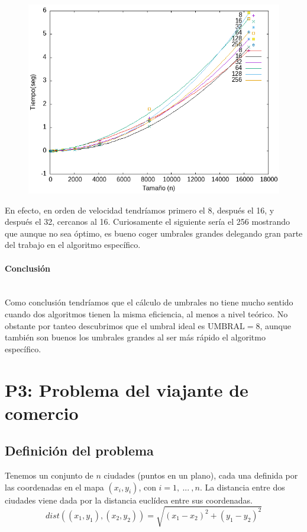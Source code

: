 \documentclass{article}
\newcommand{\myparagraph}[1]{\paragraph{#1}\mbox{}\\}
\begin{document}
    \begin{figure}[H]
        \centering
        \includegraphics[scale=0.7]{P2/Salida_comparativa2.png} 
    \end{figure}

    En efecto, en orden de velocidad tendríamos primero el 8, después el 16,
    y después el 32, cercanos al 16. Curiosamente el siguiente sería el 256
    mostrando que aunque no sea óptimo, es bueno coger umbrales grandes
    delegando gran parte del trabajo en el algoritmo específico.

    \myparagraph{Conclusión}

    Como conclusión tendríamos que el cálculo de umbrales no tiene mucho
    sentido cuando dos algoritmos tienen la misma eficiencia, al menos a
    nivel teórico. No obstante por tanteo descubrimos que el umbral ideal
    es $\text{UMBRAL}=8$, aunque también son buenos los umbrales grandes al ser
    más rápido el algoritmo específico.
    

\newpage
\section{P3: Problema del viajante de comercio}

\subsection{Definición del problema}


Tenemos un conjunto de $n$ ciudades (puntos en un plano),
cada una definida por las coordenadas en el mapa $(x_i, y_i)$,
con $i = 1,\ ...\ , n$. La distancia entre dos ciudades viene
dada por la distancia euclídea entre sus coordenadas.
\[
dist((x_1, y_1),(x_2, y_2)) = \sqrt{(x_1 - x_2)^2 + (y_1 - y_2)^2}
\]
\end{document}
